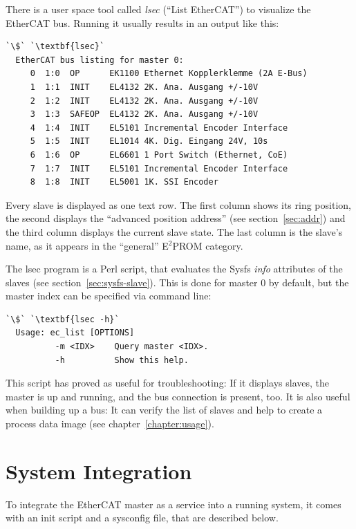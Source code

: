 \documentclass[a4paper,12pt,BCOR6mm,bibtotoc,idxtotoc]{scrbook}
\begin{document}
There is a user space tool called \textit{lsec} (``List
EtherCAT'') to visualize the EtherCAT bus. Running it usually results
in an output like this:

\begin{lstlisting}[gobble=2]
  `\$` `\textbf{lsec}`
  EtherCAT bus listing for master 0:
     0  1:0  OP      EK1100 Ethernet Kopplerklemme (2A E-Bus)
     1  1:1  INIT    EL4132 2K. Ana. Ausgang +/-10V
     2  1:2  INIT    EL4132 2K. Ana. Ausgang +/-10V
     3  1:3  SAFEOP  EL4132 2K. Ana. Ausgang +/-10V
     4  1:4  INIT    EL5101 Incremental Encoder Interface
     5  1:5  INIT    EL1014 4K. Dig. Eingang 24V, 10s
     6  1:6  OP      EL6601 1 Port Switch (Ethernet, CoE)
     7  1:7  INIT    EL5101 Incremental Encoder Interface
     8  1:8  INIT    EL5001 1K. SSI Encoder
\end{lstlisting}

Every slave is displayed as one text row. The first column shows its
ring position, the second displays the ``advanced position address''
(see section~\ref{sec:addr}) and the third column displays the current
slave state. The last column is the slave's name, as it appears in the
``general'' E$^2$PROM category.

The lsec program is a Perl script, that evaluates the Sysfs
\textit{info} attributes of the slaves (see
section~\ref{sec:sysfs-slave}). This is done for master $0$ by
default, but the master index can be specified via command line:

\begin{lstlisting}[gobble=2]
  `\$` `\textbf{lsec -h}`
  Usage: ec_list [OPTIONS]
          -m <IDX>    Query master <IDX>.
          -h          Show this help.
\end{lstlisting}

This script has proved as useful for troubleshooting: If it displays
slaves, the master is up and running, and the bus connection is
present, too. It is also useful when building up a bus: It can verify
the list of slaves and help to create a process data image (see
chapter~\ref{chapter:usage}).


\section{System Integration}
\label{sec:system}

To integrate the EtherCAT master as a service into a running system, it comes
with an init script and a sysconfig file, that are described below.
\end{document}
